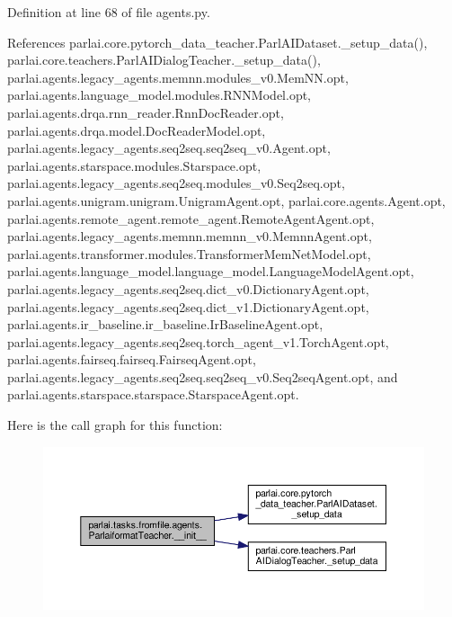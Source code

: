 Definition at line 68 of file agents.\+py.



References parlai.\+core.\+pytorch\+\_\+data\+\_\+teacher.\+Parl\+A\+I\+Dataset.\+\_\+setup\+\_\+data(), parlai.\+core.\+teachers.\+Parl\+A\+I\+Dialog\+Teacher.\+\_\+setup\+\_\+data(), parlai.\+agents.\+legacy\+\_\+agents.\+memnn.\+modules\+\_\+v0.\+Mem\+N\+N.\+opt, parlai.\+agents.\+language\+\_\+model.\+modules.\+R\+N\+N\+Model.\+opt, parlai.\+agents.\+drqa.\+rnn\+\_\+reader.\+Rnn\+Doc\+Reader.\+opt, parlai.\+agents.\+drqa.\+model.\+Doc\+Reader\+Model.\+opt, parlai.\+agents.\+legacy\+\_\+agents.\+seq2seq.\+seq2seq\+\_\+v0.\+Agent.\+opt, parlai.\+agents.\+starspace.\+modules.\+Starspace.\+opt, parlai.\+agents.\+legacy\+\_\+agents.\+seq2seq.\+modules\+\_\+v0.\+Seq2seq.\+opt, parlai.\+agents.\+unigram.\+unigram.\+Unigram\+Agent.\+opt, parlai.\+core.\+agents.\+Agent.\+opt, parlai.\+agents.\+remote\+\_\+agent.\+remote\+\_\+agent.\+Remote\+Agent\+Agent.\+opt, parlai.\+agents.\+legacy\+\_\+agents.\+memnn.\+memnn\+\_\+v0.\+Memnn\+Agent.\+opt, parlai.\+agents.\+transformer.\+modules.\+Transformer\+Mem\+Net\+Model.\+opt, parlai.\+agents.\+language\+\_\+model.\+language\+\_\+model.\+Language\+Model\+Agent.\+opt, parlai.\+agents.\+legacy\+\_\+agents.\+seq2seq.\+dict\+\_\+v0.\+Dictionary\+Agent.\+opt, parlai.\+agents.\+legacy\+\_\+agents.\+seq2seq.\+dict\+\_\+v1.\+Dictionary\+Agent.\+opt, parlai.\+agents.\+ir\+\_\+baseline.\+ir\+\_\+baseline.\+Ir\+Baseline\+Agent.\+opt, parlai.\+agents.\+legacy\+\_\+agents.\+seq2seq.\+torch\+\_\+agent\+\_\+v1.\+Torch\+Agent.\+opt, parlai.\+agents.\+fairseq.\+fairseq.\+Fairseq\+Agent.\+opt, parlai.\+agents.\+legacy\+\_\+agents.\+seq2seq.\+seq2seq\+\_\+v0.\+Seq2seq\+Agent.\+opt, and parlai.\+agents.\+starspace.\+starspace.\+Starspace\+Agent.\+opt.

Here is the call graph for this function\+:
\nopagebreak
\begin{figure}[H]
\begin{center}
\leavevmode
\includegraphics[width=350pt]{classparlai_1_1tasks_1_1fromfile_1_1agents_1_1ParlaiformatTeacher_a8d12f43b6359996764d176ba9a21189c_cgraph}
\end{center}
\end{figure}


